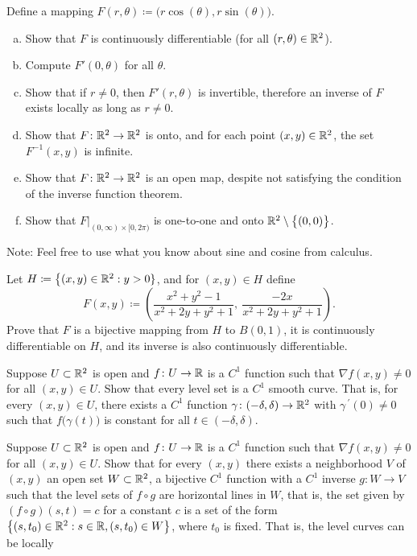 \begin{exercise} \label{mv:exercise:polarcoordinates}
Define a mapping $F(r,\theta) \coloneqq \bigl(r \cos(\theta), r \sin(\theta) \bigr)$.
\begin{enumerate}[a)]
\item
Show that $F$ is continuously differentiable (for all $(r,\theta) \in
{\mathbb{R}}^2$).
\item
Compute $F'(0,\theta)$ for all $\theta$.
\item
Show that if $r \not= 0$, then $F'(r,\theta)$ is invertible, therefore an
inverse of $F$ exists locally as long as $r \not= 0$.
\item
Show that $F \colon {\mathbb{R}}^2 \to {\mathbb{R}}^2$ is onto, and for each point $(x,y) \in
{\mathbb{R}}^2$, the set $F^{-1}(x,y)$ is infinite.
\item
Show that $F \colon {\mathbb{R}}^2 \to {\mathbb{R}}^2$ is an open map, despite not satisfying the condition of the
inverse function theorem.
\item
Show that $F|_{(0,\infty) \times [0,2\pi)}$ is one-to-one and onto
${\mathbb{R}}^2 \setminus \bigl\{ (0,0) \bigr\}$.
\end{enumerate}
Note: Feel free to use what you know about sine and cosine from calculus.
\end{exercise}

\begin{exercise}
Let $H \coloneqq \bigl\{ (x,y) \in {\mathbb{R}}^2 : y > 0 \}$, and for $(x,y) \in H$
define
\begin{equation*}
F(x,y) \coloneqq \left(
\frac{x^2+y^2-1}{x^2+2y+y^2+1}
,~
\frac{-2x}{x^2+2y+y^2+1}
\right) .
\end{equation*}
Prove that $F$ is a bijective mapping from $H$ to $B(0,1)$, it is
continuously differentiable on $H$, and its inverse is also continuously
differentiable.
\end{exercise}

\begin{exercise}
Suppose $U \subset {\mathbb{R}}^2$ is open and $f \colon U \to {\mathbb{R}}$ is
a $C^1$ function such
that $\nabla f(x,y) \not= 0$ for all $(x,y) \in U$.  Show that every
level set is a $C^1$ smooth curve.  That is,
for every
$(x,y) \in U$, there exists a $C^1$ function $\gamma \colon (-\delta,\delta)
\to {\mathbb{R}}^2$ with $\gamma^{\:\prime}(0) \not= 0$ such that
$f\bigl(\gamma(t)\bigr)$ is constant for all $t \in (-\delta,\delta)$.
\end{exercise}

\begin{exercise}
Suppose $U \subset {\mathbb{R}}^2$ is open and $f \colon U \to {\mathbb{R}}$ is
a $C^1$ function such
that $\nabla f(x,y) \not= 0$ for all $(x,y) \in U$.
Show that for every $(x,y)$ there exists a neighborhood $V$ of $(x,y)$
an open set $W \subset {\mathbb{R}}^2$, a bijective $C^1$ function with
a $C^1$ inverse $g \colon W \to V$ such that
the level sets of $f \circ g$ are horizontal lines in $W$, that is,
the set given by $(f \circ g) (s,t) = c$ for a constant $c$ is a set of the form
$\bigl\{ (s,t_0) \in {\mathbb{R}}^2 : s \in {\mathbb{R}}, (s,t_0) \in W \bigr\}$, where $t_0$ is fixed.
That is, the level curves can be locally 
\end{exercise}

